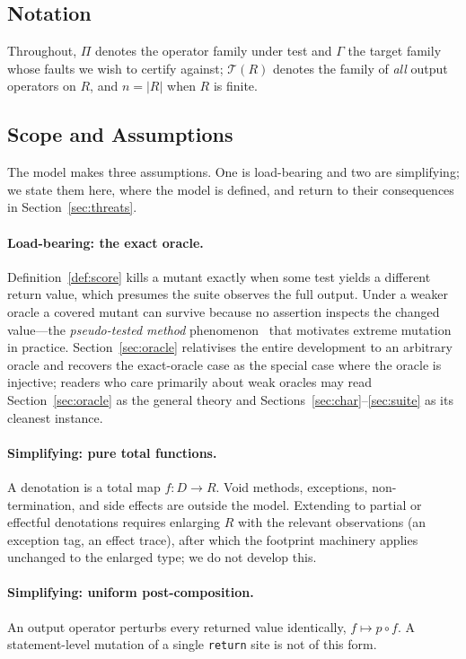 \documentclass[runningheads,envcountsect,envcountsame]{llncs}
\newcommand{\TR}{\mathcal{T}(R)}
\begin{document}
\subsection{Notation}

Throughout, $\Pi$ denotes the operator family under test and $\Gamma$ the target
family whose faults we wish to certify against; $\TR$ denotes the family of
\emph{all} output operators on $R$, and $n = |R|$ when $R$ is finite.

\subsection{Scope and Assumptions}
\label{sec:scope}

The model makes three assumptions. One is load-bearing and two are simplifying;
we state them here, where the model is defined, and return to their consequences
in Section~\ref{sec:threats}.

\paragraph{Load-bearing: the exact oracle.}
Definition~\ref{def:score} kills a mutant exactly when some test yields a
different return value, which presumes the suite observes the full output. Under
a weaker oracle a covered mutant can survive because no assertion inspects the
changed value---the \emph{pseudo-tested method}
phenomenon~\cite{niedermayr2016,veraperez2018} that motivates extreme mutation in
practice. Section~\ref{sec:oracle} relativises the entire development to an
arbitrary oracle and recovers the exact-oracle case as the special case where the
oracle is injective; readers who care primarily about weak oracles may read
Section~\ref{sec:oracle} as the general theory and
Sections~\ref{sec:char}--\ref{sec:suite} as its cleanest instance.

\paragraph{Simplifying: pure total functions.}
A denotation is a total map $f : D \to R$. Void methods, exceptions,
non-termination, and side effects are outside the model. Extending to partial or
effectful denotations requires enlarging $R$ with the relevant observations (an
exception tag, an effect trace), after which the footprint machinery applies
unchanged to the enlarged type; we do not develop this.

\paragraph{Simplifying: uniform post-composition.}
An output operator perturbs every returned value identically, $f \mapsto p \circ
f$. A statement-level mutation of a single \texttt{return} site is not of this
form.
\end{document}
